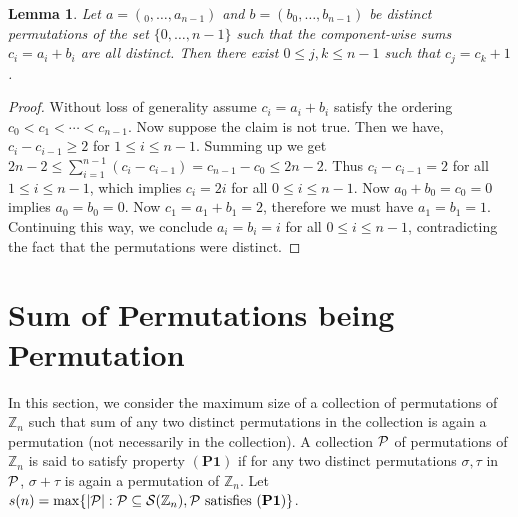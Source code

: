 \documentclass[12pt]{article}
\newcommand{\Zn}{\mathbb{Z}_n}
\newcommand{\PsZn}{{\cal S}(\Zn)}
\newtheorem{lemma}[defn]{{\bf Lemma}}
\begin{document}
\begin{lemma}\label{lem:distinctsum}
Let $a=(_0,\ldots,a_{n-1})$ and $b=(b_0,\ldots,b_{n-1})$
be distinct permutations of the set $\{0,\ldots,n-1\}$ such that the
component-wise sums $c_i=a_i+b_i$ are all distinct. Then there exist $0\leq
j,k\leq n-1$ such that $c_j = c_k+1$. 
\end{lemma}
\begin{proof}
Without loss of generality assume $c_i=a_i+b_i$
satisfy the ordering $c_0<c_1<\cdots < c_{n-1}$. Now suppose the claim is
not true. Then we have, 
$c_i-c_{i-1}\geq 2$ for $1\leq i\leq n-1$.  Summing up we get $2n-2 \leq \sum_{i=1}^{n-1}
(c_i-c_{i-1}) = c_{n-1}-c_0 \leq 2n-2$. Thus $c_i-c_{i-1}=2$ for all $1\leq
i\leq n-1$, which implies $c_i=2i$ for all $0\leq i\leq n-1$. Now
$a_0+b_0=c_0=0$ implies $a_0=b_0=0$. Now $c_1=a_1+b_1=2$, therefore we must
have $a_1=b_1=1$. Continuing this way, we conclude $a_i=b_i=i$ for all
$0\leq i\leq n-1$, contradicting the fact that the permutations were
distinct. 
\end{proof}


\section{Sum of Permutations being Permutation}\label{sec:sumperm}
In this section, we consider the maximum size of a collection of
permutations of $\Zn$ such that sum of any two distinct permutations in the
collection is again a permutation (not necessarily in the collection). A
collection ${\cal P}$ of permutations of $\Zn$ is said to satisfy property
$\mathbf{(P1)}$ if for any two distinct permutations $\sigma,\tau$ in
${\cal P}$, $\sigma+\tau$ is again a permutation of $\Zn$. Let $s(n)=\max\{|{\cal P}|: {\cal P}\subseteq \PsZn, {\cal P}
\text{ satisfies } \mathbf{(P1)} \}$.\medskip
\end{document}
